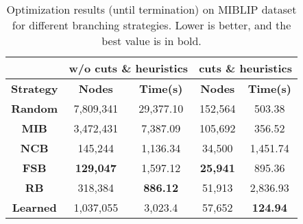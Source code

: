 \begin{table}[htb!]
    \centering
    \begin{tabular}{|c c c c c|}
        \hline
        \textbf{} & \multicolumn{2}{c}{\textbf{w/o cuts \& heuristics}} & \multicolumn{2}{c|}{\textbf{cuts \& heuristics}}\\
        \hline
        \textbf{Strategy} & \textbf{Nodes} & \textbf{Time(s)} & \textbf{Nodes} & \textbf{Time(s)} \\
        \hline
        \textbf{Random} & 7,809,341 & 29,377.10 & 152,564 & 503.38 \\
        \textbf{MIB} & 3,472,431 & 7,387.09 & 105,692 & 356.52 \\
        \textbf{NCB} & 145,244 & 1,136.34 & 34,500 & 1,451.74\\
        \textbf{FSB} & \textbf{129,047} & 1,597.12 & \textbf{25,941} & 895.36\\
        \textbf{RB} & 318,384 & \textbf{886.12} & 51,913 & 2,836.93\\
        \textbf{Learned} & 1,037,055 & 3,023.4 & 57,652 & \textbf{124.94}\\
        \hline
    \end{tabular}
    \caption{Optimization results (until termination) on MIBLIP dataset for different branching strategies.
    Lower is better, and the best value is in bold.}
    \label{tab:alvarez-results-2}
\end{table}